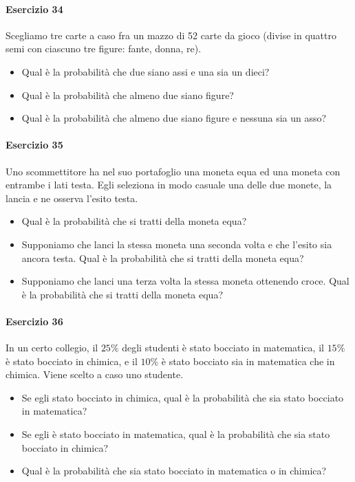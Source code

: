 \documentclass[12pt]{article}
\begin{document}
    \paragraph{Esercizio 34}
    Scegliamo tre carte a caso fra un mazzo di 52 carte da gioco (divise in quattro semi con ciascuno tre figure: fante, donna, re).
    \begin{itemize}
        \item Qual è la probabilità che due siano assi e una sia un dieci?
        \item Qual è la probabilità che almeno due siano figure?
        \item Qual è la probabilità che almeno due siano figure e nessuna sia un asso?
    \end{itemize}
    \paragraph{Esercizio 35}
    Uno scommettitore ha nel suo portafoglio una moneta equa ed una moneta con entrambe i lati testa. Egli seleziona in modo casuale una delle due monete, la lancia e ne osserva l’esito testa.
    \begin{itemize}
        \item Qual è la probabilità che si tratti della moneta equa?
        \item Supponiamo che lanci la stessa moneta una seconda volta e che l’esito sia ancora testa. Qual è la probabilità che si tratti della moneta equa?
        \item Supponiamo che lanci una terza volta la stessa moneta ottenendo croce. Qual è la probabilità che si tratti della moneta equa?
    \end{itemize}
    \paragraph{Esercizio 36}
    In un certo collegio, il $25\%$ degli studenti è stato bocciato in matematica, il $15\%$ è stato bocciato in chimica, e il $10\%$ è stato bocciato sia in matematica che in chimica. Viene scelto a caso uno studente.
    \begin{itemize}
        \item Se egli stato bocciato in chimica, qual è la probabilità che sia stato bocciato in matematica?
        \item Se egli è stato bocciato in matematica, qual è la probabilità che sia stato bocciato in chimica?
        \item Qual è la probabilità che sia stato bocciato in matematica o in chimica?
    \end{itemize}
    \newpage
\end{document}
